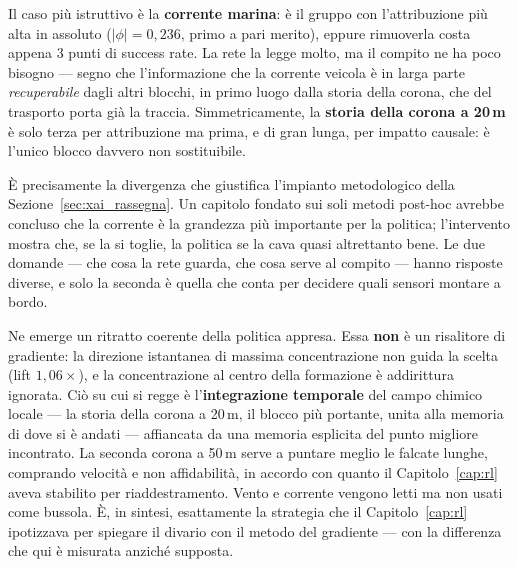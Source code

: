 Il caso pi\`u istruttivo \`e la \textbf{corrente marina}: \`e il gruppo con
l'attribuzione pi\`u alta in assoluto ($|\phi| = 0{,}236$, primo a pari merito), eppure
rimuoverla costa appena $3$ punti di success rate. La rete la legge molto, ma il compito
ne ha poco bisogno --- segno che l'informazione che la corrente veicola \`e in larga parte
\emph{recuperabile} dagli altri blocchi, in primo luogo dalla storia della corona, che del
trasporto porta gi\`a la traccia. Simmetricamente, la \textbf{storia della corona a
20\,m} \`e solo terza per attribuzione ma prima, e di gran lunga, per impatto causale: \`e
l'unico blocco davvero non sostituibile.

\`E precisamente la divergenza che giustifica l'impianto metodologico della
Sezione~\ref{sec:xai_rassegna}. Un capitolo fondato sui soli metodi post-hoc avrebbe
concluso che la corrente \`e la grandezza pi\`u importante per la politica; l'intervento
mostra che, se la si toglie, la politica se la cava quasi altrettanto bene. Le due
domande --- che cosa la rete guarda, che cosa serve al compito --- hanno risposte diverse,
e solo la seconda \`e quella che conta per decidere quali sensori montare a bordo.

Ne emerge un ritratto coerente della politica appresa. Essa \textbf{non} \`e un
risalitore di gradiente: la direzione istantanea di massima concentrazione non guida la
scelta (lift $1{,}06\times$), e la concentrazione al centro della formazione \`e
addirittura ignorata. Ci\`o su cui si regge \`e l'\textbf{integrazione temporale} del
campo chimico locale --- la storia della corona a 20\,m, il blocco pi\`u portante, unita
alla memoria di dove si \`e andati --- affiancata da una memoria esplicita del punto
migliore incontrato. La seconda corona a 50\,m serve a puntare meglio le falcate lunghe,
comprando velocit\`a e non affidabilit\`a, in accordo con quanto il
Capitolo~\ref{cap:rl} aveva stabilito per riaddestramento. Vento e corrente vengono letti
ma non usati come bussola. \`E, in sintesi, esattamente la strategia che il
Capitolo~\ref{cap:rl} ipotizzava per spiegare il divario con il metodo del gradiente ---
con la differenza che qui \`e misurata anzich\'e supposta.

